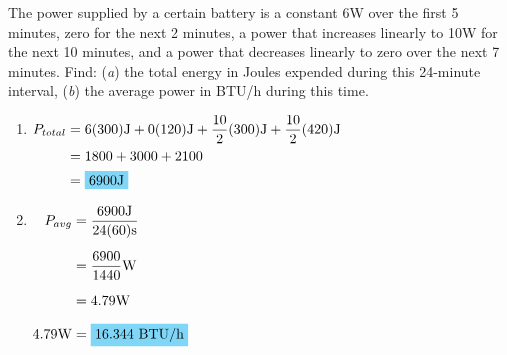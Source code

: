 The power supplied by a certain battery is a constant 6W over the first 5 minutes, zero for the next 2 minutes, a power that increases linearly to 10W for the next 10 minutes, and a power that decreases linearly to zero over the next 7 minutes. Find: (\emph{a}) the total energy in Joules expended during this 24-minute interval, (\emph{b}) the average power in BTU/h during this time.

\begin{enumerate}[leftmargin=2cm,labelsep=.5cm,label=\bfseries\alph*)]
	\item $
	\begin{aligned}[t]
	P_{total} &= 6(300)\qw{\joule}+0(120)\qw{\J}+\frac{10}{2}(300)\qw{\J}+\frac{10}{2}(420)\qw{\J} \\
			  &= 1800+3000+2100 \\
			  &= \hlbox{6900\qw{\J}} \\
	\end{aligned} $
	\\[1cm]
	
	\item $
	\begin{aligned}[t]
	P_{avg} &= \frac{6900\qw{\J}}{24(60)\qw{\second}} \\[.2cm]
			&= \frac{6900}{1440}\qw{\watt} \\[.2cm]
			&= 4.79\qw{\watt} \\[.2cm]
	4.79\qw{\watt} &= \hlbox{16.344\text{ BTU/h}} \\
	\end{aligned} $
	\\[1cm]
\end{enumerate}